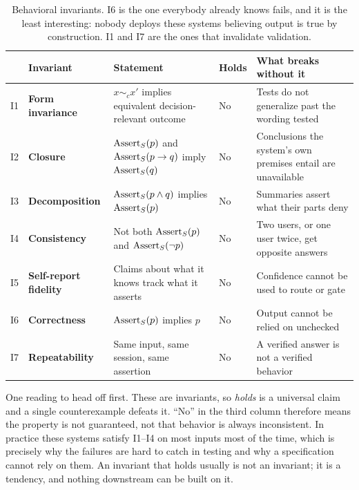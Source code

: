 \begin{table}[ht]
  \centering
  \small
  \begin{tabular}{@{}>{\raggedright\arraybackslash}p{0.5cm}>{\raggedright\arraybackslash}p{2.9cm}>{\raggedright\arraybackslash}p{4.1cm}>{\raggedright\arraybackslash}p{1.1cm}>{\raggedright\arraybackslash}p{4.4cm}@{}}
    \toprule
    & Invariant & Statement & Holds & What breaks without it \\
    \midrule
    I1 & \textbf{Form invariance}
       & $x \sim_c x'$ implies equivalent decision-relevant outcome
       & No
       & Tests do not generalize past the wording tested \\
    \addlinespace
    I2 & \textbf{Closure}
       & $\operatorname{Assert}_S(p)$ and $\operatorname{Assert}_S(p \rightarrow q)$ imply $\operatorname{Assert}_S(q)$
       & No
       & Conclusions the system's own premises entail are unavailable \\
    \addlinespace
    I3 & \textbf{Decomposition}
       & $\operatorname{Assert}_S(p \wedge q)$ implies $\operatorname{Assert}_S(p)$
       & No
       & Summaries assert what their parts deny \\
    \addlinespace
    I4 & \textbf{Consistency}
       & Not both $\operatorname{Assert}_S(p)$ and $\operatorname{Assert}_S(\neg p)$
       & No
       & Two users, or one user twice, get opposite answers \\
    \addlinespace
    I5 & \textbf{Self-report fidelity}
       & Claims about what it knows track what it asserts
       & No
       & Confidence cannot be used to route or gate \\
    \addlinespace
    I6 & \textbf{Correctness}
       & $\operatorname{Assert}_S(p)$ implies $p$
       & No
       & Output cannot be relied on unchecked \\
    \addlinespace
    I7 & \textbf{Repeatability}
       & Same input, same session, same assertion
       & No
       & A verified answer is not a verified behavior \\
    \bottomrule
  \end{tabular}
  \caption{Behavioral invariants. I6 is the one everybody already knows fails, and
    it is the least interesting: nobody deploys these systems believing output is
    true by construction. I1 and I7 are the ones that invalidate validation.}
  \label{tab:invariants-behavior}
\end{table}

One reading to head off first. These are invariants, so \emph{holds} is a universal
claim and a single counterexample defeats it. ``No'' in the third column therefore
means the property is not guaranteed, not that behavior is always inconsistent. In
practice these systems satisfy I1--I4 on most inputs most of the time, which is
precisely why the failures are hard to catch in testing and why a specification cannot
rely on them. An invariant that holds usually is not an invariant; it is a tendency,
and nothing downstream can be built on it.

